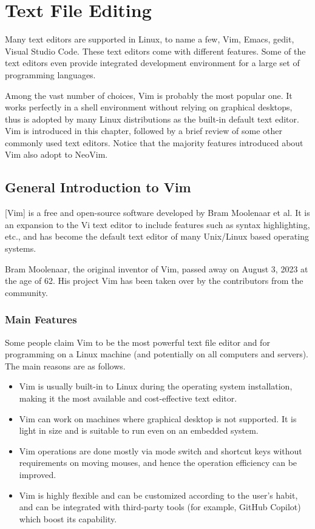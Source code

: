 \chapter{Text File Editing} \label{ch:tfe}

Many text editors are supported in Linux, to name a few, Vim, Emacs, gedit, Visual Studio Code. These text editors come with different features. Some of the text editors even provide integrated development environment for a large set of programming languages.

Among the vast number of choices, Vim is probably the most popular one. It works perfectly in a shell environment without relying on graphical desktops, thus is adopted by many Linux distributions as the built-in default text editor. Vim is introduced in this chapter, followed by a brief review of some other commonly used text editors. Notice that the majority features introduced about Vim also adopt to NeoVim.

\section{General Introduction to Vim}

[Vim] is a free and open-source software developed by Bram Moolenaar et al. It is an expansion to the Vi text editor to include features such as syntax highlighting, etc., and has become the default text editor of many Unix/Linux based operating systems.

Bram Moolenaar, the original inventor of Vim, passed away on August 3, 2023 at the age of 62. His project Vim has been taken over by the contributors from the community. 

\subsection{Main Features}

Some people claim Vim to be the most powerful text file editor and  for programming on a Linux machine (and potentially on all computers and servers). The main reasons are as follows.
\begin{itemize}
  \item Vim is usually built-in to Linux during the operating system installation, making it the most available and cost-effective text editor.
  \item Vim can work on machines where graphical desktop is not supported. It is light in size and is suitable to run even on an embedded system.
  \item Vim operations are done mostly via mode switch and shortcut keys without requirements on moving mouses, and hence the operation efficiency can be improved.
  \item Vim is highly flexible and can be customized according to the user's habit, and can be integrated with third-party tools (for example, GitHub Copilot) which boost its capability.
\end{itemize}

